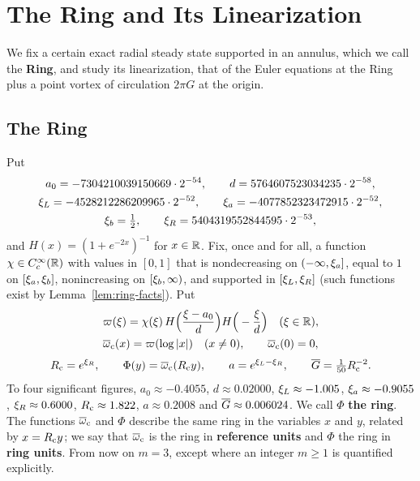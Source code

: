 \section{The Ring and Its Linearization}
\label{sec:ring}

We fix a certain exact radial steady state supported in an annulus, which we
call the \textbf{Ring}, and study its linearization, that of the Euler equations
at the Ring plus a point vortex of circulation $2\pi G$ at the origin.

\subsection{The Ring}
\label{sec:ring-def}

\begin{definition}
\label{def:ring}
Put
\[
\begin{gathered}
a_0=-7304210039150669\cdot2^{-54},\qquad d=5764607523034235\cdot2^{-58},\\
\xi_L=-4528212286209965\cdot2^{-52},\qquad \xi_a=-4077852323472915\cdot2^{-52},\\
\xi_b=\tfrac12,\qquad \xi_R=5404319552844595\cdot2^{-53},
\end{gathered}
\]
and $H(x)=(1+e^{-2x})^{-1}$ for $x\in\mathbb{R}$. Fix, once and for all, a function
$\chi\in C_c^\infty(\mathbb{R})$ with values in $[0,1]$ that is nondecreasing on
$(-\infty,\xi_a]$, equal to $1$ on $[\xi_a,\xi_b]$, nonincreasing on
$[\xi_b,\infty)$, and supported in $[\xi_L,\xi_R]$ (such functions exist by
Lemma~\ref{lem:ring-facts}). Put
\[
\begin{gathered}
\varpi(\xi)=\chi(\xi)\,H\Big(\frac{\xi-a_0}{d}\Big)H\Big(-\frac{\xi}{d}\Big)\quad(\xi\in\mathbb{R}),\\
\overline{\omega}_{\mathrm{c}}(x)=\varpi(\log|x|)\quad(x\ne0),\qquad \overline{\omega}_{\mathrm{c}}(0)=0,
\end{gathered}
\]
\[
R_{\mathrm{c}}=e^{\xi_R},\qquad \Phi(y)=\overline{\omega}_{\mathrm{c}}(R_{\mathrm{c}} y),\qquad a=e^{\xi_L-\xi_R},\qquad
\overline{G}=\tfrac1{50}R_{\mathrm{c}}^{-2}.
\]
To four significant figures, $a_0\approx-0.4055$, $d\approx0.02000$,
$\xi_L\approx-1.005$, $\xi_a\approx-0.9055$, $\xi_R\approx0.6000$,
$R_{\mathrm{c}}\approx1.822$, $a\approx0.2008$ and $\overline{G}\approx0.006024$.
We call $\Phi$ \textbf{the ring}. The functions $\overline{\omega}_{\mathrm{c}}$ and $\Phi$ describe the
same ring in the variables $x$ and $y$, related by $x=R_{\mathrm{c}} y$; we say that
$\overline{\omega}_{\mathrm{c}}$ is the ring in \textbf{reference units} and $\Phi$ the ring in
\textbf{ring units}. From now on $m=3$, except where an integer $m\ge1$ is
quantified explicitly.
\end{definition}


